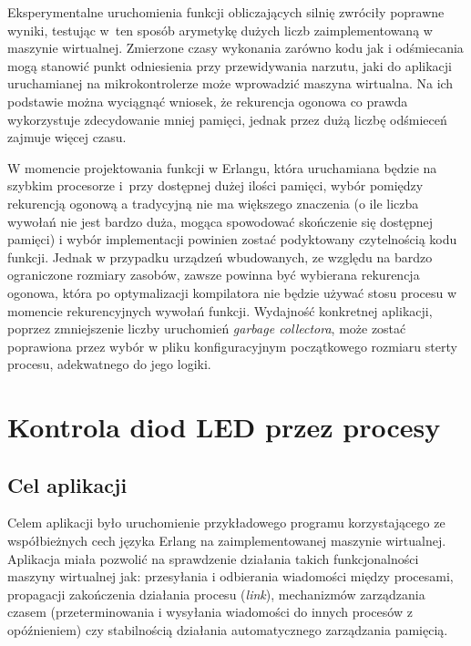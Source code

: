 Eksperymentalne uruchomienia funkcji obliczających silnię zwróciły poprawne wyniki, testując w~ten sposób arymetykę dużych liczb zaimplementowaną w maszynie wirtualnej.
Zmierzone czasy wykonania zarówno kodu jak i odśmiecania mogą stanowić punkt odniesienia przy przewidywania narzutu, jaki do aplikacji uruchamianej na mikrokontrolerze może wprowadzić maszyna wirtualna.
Na ich podstawie można wyciągnąć wniosek, że rekurencja ogonowa co prawda wykorzystuje zdecydowanie mniej pamięci, jednak przez dużą liczbę odśmieceń zajmuje więcej czasu. 

W momencie projektowania funkcji w Erlangu, która uruchamiana będzie na szybkim procesorze i~przy dostępnej dużej ilości pamięci, wybór pomiędzy rekurencją ogonową a tradycyjną nie ma większego znaczenia (o ile liczba wywołań nie jest bardzo duża, mogąca spowodować skończenie się dostępnej pamięci) i wybór implementacji powinien zostać podyktowany czytelnością kodu funkcji. Jednak w przypadku urządzeń wbudowanych, ze względu na bardzo ograniczone rozmiary zasobów, zawsze powinna być wybierana rekurencja ogonowa, która po optymalizacji kompilatora nie będzie używać stosu procesu w momencie rekurencyjnych wywołań funkcji.
Wydajność konkretnej aplikacji, poprzez zmniejszenie liczby uruchomień \emph{garbage collectora}, może zostać poprawiona przez wybór w pliku konfiguracyjnym początkowego rozmiaru sterty procesu, adekwatnego do jego logiki.


\section{Kontrola diod LED przez procesy}
\label{sec:przykladyDiody}

\subsection{Cel aplikacji}

Celem aplikacji było uruchomienie przykładowego programu korzystającego ze współbieżnych cech języka Erlang na zaimplementowanej maszynie wirtualnej.
Aplikacja miała pozwolić na sprawdzenie działania takich funkcjonalności maszyny wirtualnej jak:
przesyłania i odbierania wiadomości między procesami, propagacji zakończenia działania procesu (\emph{link}), mechanizmów zarządzania czasem (przeterminowania i wysyłania wiadomości do innych procesów z opóźnieniem) czy stabilnością działania automatycznego zarządzania pamięcią.

